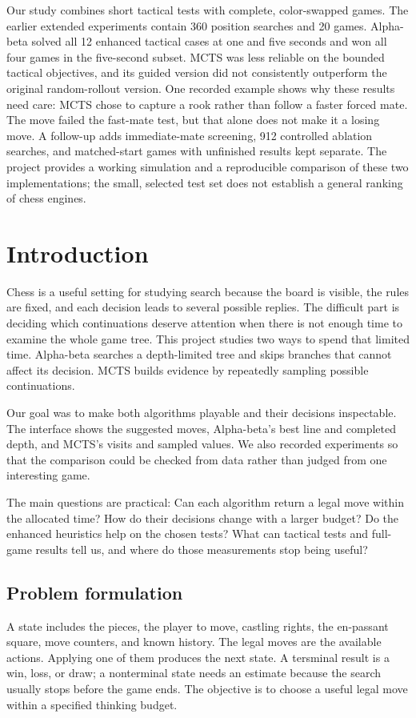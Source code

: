 \documentclass[oneside,final]{hcmut-report}
\begin{document}
Our study combines short tactical tests with complete, color-swapped games.
The earlier extended experiments contain 360 position searches and 20 games. Alpha-beta solved all 12 enhanced tactical
cases at one and five seconds and won all four games in the five-second
subset. MCTS was less reliable on the bounded tactical objectives, and its
guided version did not consistently outperform the original random-rollout
version. One recorded example shows why these results need care: MCTS chose
to capture a rook rather than follow a faster forced mate. The move failed the
fast-mate test, but that alone does not make it a losing move. A follow-up adds immediate-mate screening, 912 controlled ablation
searches, and matched-start games with unfinished results kept separate.
The project
provides a working simulation and a reproducible comparison of these two
implementations; the small, selected test set does not establish a general
ranking of chess engines.
\clearpage

\tableofcontents
\listoffigures
\clearpage
{}

\section{Introduction}
Chess is a useful setting for studying search because the board is visible,
the rules are fixed, and each decision leads to several possible replies.
The difficult part is deciding which continuations deserve attention when
there is not enough time to examine the whole game tree. This project studies
two ways to spend that limited time. Alpha-beta searches a depth-limited tree
and skips branches that cannot affect its decision. MCTS builds evidence by
repeatedly sampling possible continuations.

Our goal was to make both algorithms playable and their decisions inspectable.
The interface shows the suggested moves, Alpha-beta's best line and completed
depth, and MCTS's visits and sampled values. We also recorded experiments so
that the comparison could be checked from data rather than judged from one
interesting game.

The main questions are practical: Can each algorithm return a legal move
within the allocated time? How do their decisions change with a larger budget?
Do the enhanced heuristics help on the chosen tests? What can tactical tests
and full-game results tell us, and where do those measurements stop being useful?

\subsection{Problem formulation}
A state includes the pieces, the player to move, castling rights, the en-passant
square, move counters, and known history. The legal moves are the available
actions. Applying one of them produces the next state. A tersminal result is a
win, loss, or draw; a nonterminal state needs an estimate because the search
usually stops before the game ends. The objective is to choose a useful legal
move within a specified thinking budget.
\end{document}
